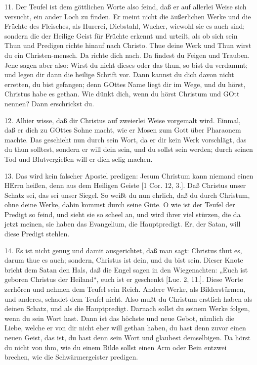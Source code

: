 11. Der Teufel ist dem göttlichen Worte also feind, daß er auf allerlei Weise sich versucht, ein ander Loch zu finden. Er meint nicht die äußerlichen Werke und die Früchte des Fleisches, als Hurerei, Diebstahl, Wucher, wiewohl sie es auch sind; sondern die der Heilige Geist für Früchte erkennt und urteilt, als ob sich sein Thun und Predigen richte hinauf nach Christo. Thue deine Werk und Thun wirst du ein Christen-mensch. Da richte dich nach. Da findest du Feigen und Trauben. Jene sagen aber also: Wirst du nicht dieses oder das thun, so bist du verdammt; und legen dir dann die heilige Schrift vor. Dann kannst du dich davon nicht erretten,
du bist gefangen; denn GOttes Name liegt dir im Wege, und du hörst, Christus habe es gethan. Wie dünkt dich, wenn du hörst Christum und GOtt nennen? Dann erschrickst du.

12. Alhier wisse, daß dir Christus auf zweierlei Weise vorgemalt wird. Einmal, daß er dich zu GOttes Sohne macht, wie er Mosen zum Gott über Pharaonem machte. Das geschieht nun durch sein Wort, da er dir kein Werk vorschlägt, das du thun solltest, sondern er will dein sein, und du sollst sein werden; durch seinen Tod und Blutvergießen will er dich selig machen.

13. Das wird kein falscher Apostel predigen: Jesum Christum kann niemand einen HErrn heißen, denn aus dem Heiligen Geiste [1 Cor. 12, 3.]. Daß Christus unser Schatz sei, das sei unser Siegel. So weißt du nun ehrlich, daß du durch Christum, ohne deine Werke, dahin kommst durch seine Güte. O wie ist der Teufel der Predigt so feind, und sieht sie so scheel an, und wird ihrer viel stürzen, die da jetzt meinen, sie haben das Evangelium, die Hauptpredigt. Er, der Satan, will diese Predigt stehlen.

14. Es ist nicht genug und damit ausgerichtet, daß man sagt: Christus thut es, darum thue es auch; sondern, Christus ist dein, und du bist sein. Dieser Knote bricht dem Satan den Hals, daß die Engel sagen in den Wiegenachten: „Euch ist geboren Christus der Heiland“, euch ist er geschenkt [Luc. 2, 11.]. Diese Worte zerhören und nehmen dem Teufel sein Reich. Andere Werke, als Bilderstürmen, und anderes, schadet dem Teufel nicht. Also mußt du Christum erstlich haben als deinen Schatz, und als die Hauptpredigt. Darnach sollst du seinem Werke folgen, wenn du sein Wort hast. Dann ist das höchste und neue Gebot, nämlich die Liebe, welche er von dir nicht eher will gethan haben, du hast denn zuvor einen neuen Geist, das ist, du hast denn sein Wort und glaubest demselbigen. Da hörst du nicht von ihm, wie du einem Bilde sollst einen Arm oder Bein entzwei brechen, wie die Schwärmergeister predigen.


